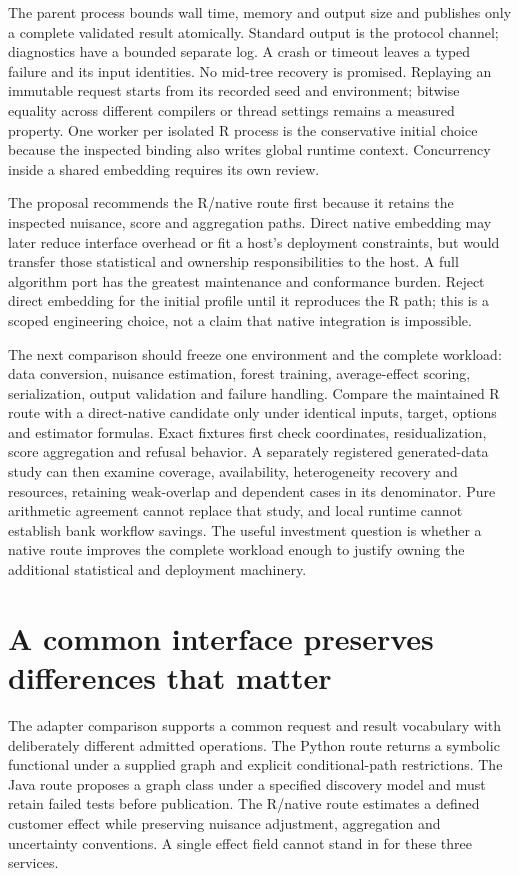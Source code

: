 The parent process bounds wall time, memory and output size and
publishes only a complete validated result atomically. Standard output
is the protocol channel; diagnostics have a bounded separate log. A
crash or timeout leaves a typed failure and its input identities. No
mid-tree recovery is promised. Replaying an immutable request starts
from its recorded seed and environment; bitwise equality across
different compilers or thread settings remains a measured property. One
worker per isolated R process is the conservative initial choice because
the inspected binding also writes global runtime context. Concurrency
inside a shared embedding requires its own review.

The proposal recommends the R/native route first because it retains the
inspected nuisance, score and aggregation paths. Direct native embedding
may later reduce interface overhead or fit a host's deployment
constraints, but would transfer those statistical and ownership
responsibilities to the host. A full algorithm port has the greatest
maintenance and conformance burden. Reject direct embedding for the
initial profile until it reproduces the R path; this is a scoped
engineering choice, not a claim that native integration is impossible.

The next comparison should freeze one environment and the complete
workload: data conversion, nuisance estimation, forest training,
average-effect scoring, serialization, output validation and failure
handling. Compare the maintained R route with a direct-native candidate
only under identical inputs, target, options and estimator formulas.
Exact fixtures first check coordinates, residualization, score
aggregation and refusal behavior. A separately registered generated-data
study can then examine coverage, availability, heterogeneity recovery
and resources, retaining weak-overlap and dependent cases in its
denominator. Pure arithmetic agreement cannot replace that study, and
local runtime cannot establish bank workflow savings. The useful
investment question is whether a native route improves the complete
workload enough to justify owning the additional statistical and
deployment machinery. \label{exec13:grf-adapter-end}

\section{A common interface preserves differences that matter}

The adapter comparison supports a common request and result vocabulary with deliberately different admitted operations. The Python route returns a symbolic functional under a supplied graph and explicit conditional-path restrictions. The Java route proposes a graph class under a specified discovery model and must retain failed tests before publication. The R/native route estimates a defined customer effect while preserving nuisance adjustment, aggregation and uncertainty conventions. A single effect field cannot stand in for these three services.

